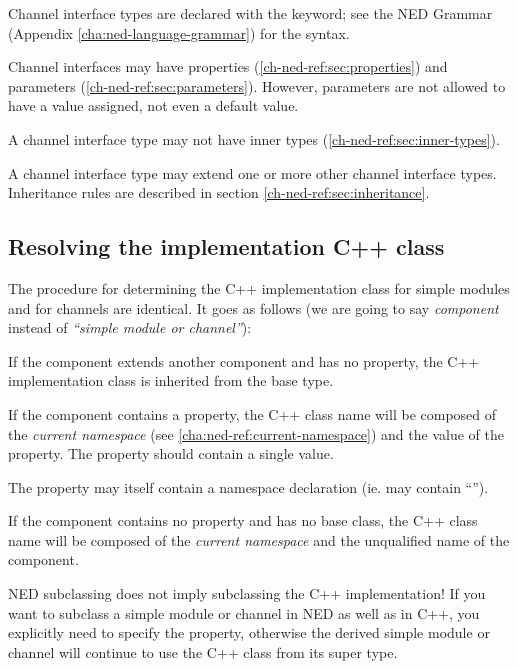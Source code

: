 Channel interface types are declared with the  keyword;
see the NED Grammar (Appendix \ref{cha:ned-language-grammar}) for the
syntax.

Channel interfaces may have properties (\ref{ch-ned-ref:sec:properties}) and
parameters (\ref{ch-ned-ref:sec:parameters}). However, parameters are not
allowed to have a value assigned, not even a default value.

A channel interface type may not have inner types (\ref{ch-ned-ref:sec:inner-types}).

A channel interface type may extend one or more other channel interface types.
Inheritance rules are described in section \ref{ch-ned-ref:sec:inheritance}.



\subsection{Resolving the implementation C++ class}
\label{ch-ned-ref:sec:resolving-cpp-class}

The procedure for determining the C++ implementation class for simple modules
and for channels are identical. It goes as follows (we are going to say
\textit{component} instead of \textit{``simple module or channel''}):

If the component extends another component and has no
 property, the C++ implementation class is inherited from the base
type.

If the component contains a  property, the C++ class
name will be composed of the \textit{current namespace} (see
\ref{cha:ned-ref:current-namespace}) and the value of the 
property. The  property should contain a single value.

\begin{note}
    The  property may itself contain a namespace declaration (ie.
    may contain ``\ttt{::}'').
\end{note}

If the component contains no  property and has no base
class, the C++ class name will be composed of the \textit{current namespace} and the
unqualified name of the component.

\begin{important}
    NED subclassing does not imply subclassing the C++ implementation! If you
    want to subclass a simple module or channel in NED as well as in C++, you
    explicitly need to specify the  property, otherwise the
    derived simple module or channel will continue to use the C++ class from its
    super type.
\end{important}

